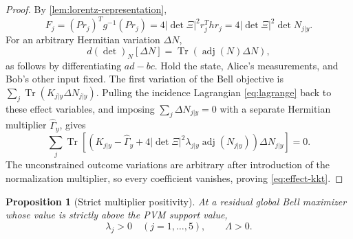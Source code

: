 \documentclass[11pt]{article}
\newtheorem{proposition}[theorem]{Proposition}
\theoremstyle{definition}
\newcommand{\Tr}{\operatorname{Tr}}
\begin{document}
\begin{proof}
By \cref{lem:lorentz-representation},
\[
F_j=(Pr_j)^Tg^{-1}(Pr_j)
=4|\det\Xi|^2r_j^Thr_j
=4|\det\Xi|^2\det N_{j|y}.
\]
For an arbitrary Hermitian variation \(\Delta N\),
\[
d(\det)_N[\Delta N]=\Tr(\operatorname{adj}(N)\Delta N),
\]
as follows by differentiating \(ad-bc\). Hold the state, Alice's
measurements, and Bob's other input fixed. The first variation of the Bell
objective is
\(\sum_j\Tr(K_{j|y}\Delta N_{j|y})\). Pulling the incidence Lagrangian
\eqref{eq:lagrange} back to these effect variables, and imposing
\(\sum_j\Delta N_{j|y}=0\) with a separate Hermitian multiplier
\(\widehat\Gamma_y\), gives
\[
\sum_j\Tr\!\left[
\left(K_{j|y}-\widehat\Gamma_y+
4|\det\Xi|^2\lambda_{j|y}\operatorname{adj}(N_{j|y})\right)
\Delta N_{j|y}\right]=0.
\]
The unconstrained outcome variations are arbitrary after introduction of the
normalization multiplier, so every coefficient vanishes, proving
\eqref{eq:effect-kkt}.
\end{proof}

\begin{proposition}[Strict multiplier positivity]
\label{prop:positive-multipliers}
At a residual global Bell maximizer whose value is strictly above the PVM
support value,
\[
\lambda_j>0\quad(j=1,\ldots,5),\qquad\Lambda>0.
\]
\end{proposition}
\end{document}
